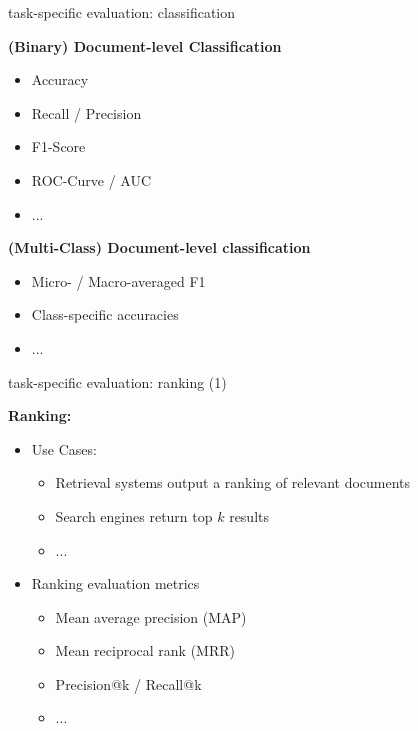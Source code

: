 \documentclass[11pt,compress,t,notes=noshow, xcolor=table]{beamer}
\begin{document}


\begin{frame}{task-specific evaluation: classification}

\vfill

\textbf{(Binary) Document-level Classification}

\begin{itemize}
	\item Accuracy
	\item Recall / Precision
	\item F1-Score
	\item ROC-Curve / AUC
	\item ...
\end{itemize}

\textbf{(Multi-Class) Document-level classification}

\begin{itemize}
	\item Micro- / Macro-averaged F1
	\item Class-specific accuracies
	\item ...
\end{itemize}
\vfill

\end{frame}


\begin{frame}{task-specific evaluation: ranking (1)}

\vfill

\textbf{Ranking:}

\begin{itemize}
		\item Use Cases:
				\begin{itemize}
					\item Retrieval systems output a ranking of relevant documents
					\item Search engines return top $k$ results
					\item ...
				\end{itemize}
		\item Ranking evaluation metrics
				\begin{itemize}
					\item Mean average precision (MAP)
					\item Mean reciprocal rank (MRR)
					\item Precision@k / Recall@k
					\item ...
				\end{itemize}
\end{itemize}
\vfill

\end{frame}
\end{document}
